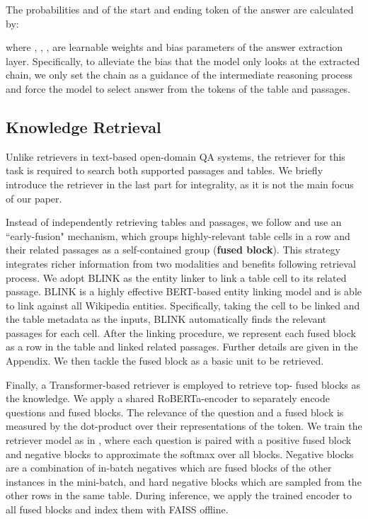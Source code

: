 \documentclass[11pt]{article}
\begin{document}
	The probabilities  and  of the start and ending token of the answer  are calculated by:
	
	where , , ,  are learnable weights and bias parameters of the answer extraction layer. 
	Specifically, to alleviate the bias that the model only looks at the extracted chain, we only set the chain as a guidance of the intermediate reasoning process and force the model to select answer from the tokens of the table and passages.
	\subsection{Knowledge Retrieval}
	\label{sec:retriever}
	Unlike retrievers in text-based open-domain QA systems, the retriever for this task is required to search both supported passages and tables. 
	We briefly introduce the retriever in the last part for integrality, as it is not the main focus of our paper. 








	Instead of independently retrieving tables and passages, we follow \citet{chen2020open} and use an ``early-fusion" mechanism, 
which groups highly-relevant table cells in a row and their related passages as a self-contained group (\textbf{fused block}). This strategy integrates richer information from two modalities and benefits following retrieval process. 
	We adopt BLINK \cite{wu2019zero} as the entity linker to link a table cell to its related passage. 
	BLINK is a highly effective BERT-based entity linking model and is able to link against all Wikipedia entities. 
	Specifically, taking the cell to be linked and the table metadata as the inputs, BLINK automatically finds the relevant passages for each cell.
	After the linking procedure, we represent each fused block as a row in the table and linked related passages. Further details are given in the Appendix. 
	We then tackle the fused block as a basic unit to be retrieved. 
	
Finally, a Transformer-based retriever is employed to retrieve top- fused blocks as the knowledge. We apply a shared RoBERTa-encoder  \cite{Liu2019RoBERTaAR} to separately encode questions and fused blocks. 
	The relevance of the question and a fused block is measured by the dot-product over their representations of the  token.
We train the retriever model as in \citet{karpukhin2020dense}, where each question is paired 
	with a positive fused block and  negative blocks to approximate the softmax over all blocks. 
	Negative blocks are a combination of in-batch negatives which are fused blocks of the other instances in the mini-batch, 
	and hard negative blocks which are sampled from the other rows in the same table.
During inference, we apply the trained encoder to all fused blocks and index them with FAISS \cite{Johnson2021Faiss} offline. 
	
\end{document}
